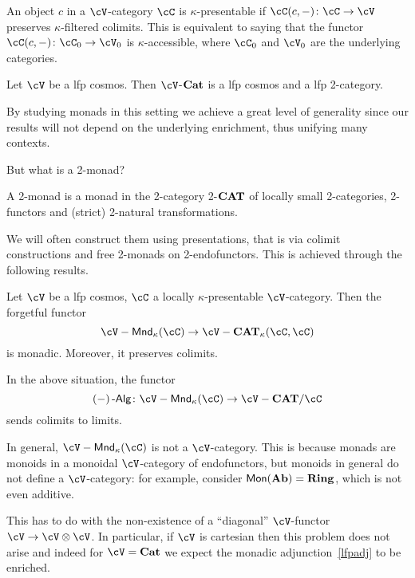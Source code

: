 \documentclass[a4paper,11pt,oneside,openany]{scrbook}
\begin{document}
\begin{defn}
    An object $c$ in a $\cV$-category $\cC$ is $\kappa$-presentable if
    $\cC(c,-)\colon\cC\rightarrow\cV$ preserves $\kappa$-filtered colimits. This
    is equivalent to saying that the functor
    $\cC(c,-)\colon\cC_0\rightarrow\cV_0$ is $\kappa$-accessible, where $\cC_0$
    and $\cV_0$ are the underlying categories.
\end{defn}

\begin{thm}
    Let $\cV$ be a lfp cosmos. Then $\cV$-${\normalfont\textbf{Cat}}$ is a lfp cosmos and a lfp
    2-category.
\end{thm}

By studying monads in this setting we achieve a great level of generality since
our results will not depend on the underlying enrichment, thus unifying many
contexts.

But what is a 2-monad?

\begin{defn}
    A 2-monad is a monad in the 2-category 2-${\normalfont\textbf{CAT}}$ of locally small
    2-categories, 2-functors and (strict) 2-natural transformations.
\end{defn}

We will often construct them using presentations, that is via colimit
constructions and free 2-monads on 2-endofunctors. This is achieved through the
following results.

\begin{thm}\label{lfpadj}
    Let $\cV$ be a lfp cosmos, $\cC$ a locally $\kappa$-presentable
    $\cV$-category. Then the forgetful functor
    \[
        \cV-\Mnd_\kappa(\cC)\rightarrow\cV-\CAT_\kappa(\cC,\cC)
    \]
    is monadic. Moreover, it preserves colimits.
\end{thm}

\begin{cor}
    In the above situation, the functor
    \[
        (-)\Alg\colon\cV-\Mnd_\kappa(\cC)\rightarrow\cV-\CAT/\cC
    \]
    sends colimits to limits.
\end{cor}

\begin{rmk}
    In general, $\cV-\Mnd_\kappa(\cC)$ is not a $\cV$-category. This is because
    monads are monoids in a monoidal $\cV$-category of endofunctors, but monoids
    in general do not define a $\cV$-category: for example, consider
    $\operatorname{\mathsf{Mon}}({\normalfont\textbf{Ab}})={\normalfont\textbf{Ring}}$, which is not even additive.

    This has to do with the non-existence of a ``diagonal'' $\cV$-functor
    $\cV\rightarrow\cV\otimes\cV$. In particular, if $\cV$ is cartesian then
    this problem does not arise and indeed for $\cV=\Cat$ we expect the
    monadic adjunction~\ref{lfpadj} to be enriched.
\end{rmk}
\end{document}
